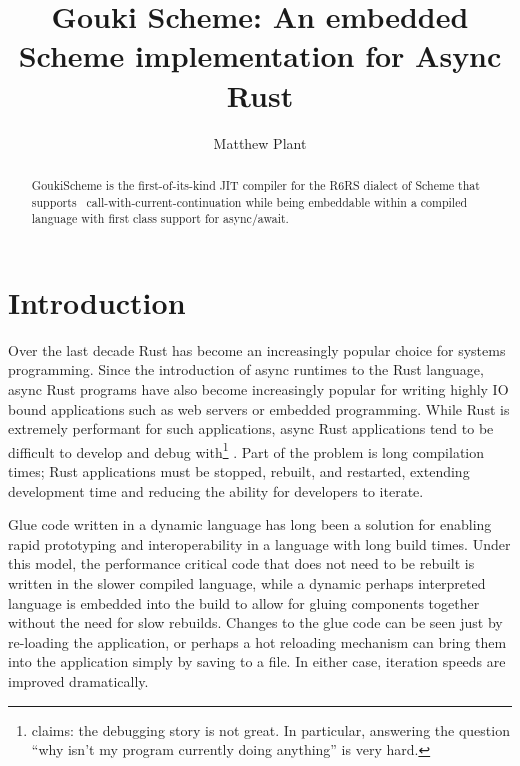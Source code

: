 \documentclass[sigplan,authordraft]{acmart}
\begin{document}
\title{Gouki Scheme: An embedded Scheme implementation for Async Rust}

\author{Matthew Plant}

\begin{abstract}

  GoukiScheme is the first-of-its-kind JIT compiler for the R6RS dialect of
  Scheme that supports \
  call-with-current-continuation while being embeddable
  within a compiled language with first class support for async/await.

\end{abstract}

\maketitle

\section{Introduction}

Over the last decade Rust has become an increasingly popular choice for systems
programming. Since the introduction of async runtimes to the Rust language,
async Rust programs have also become increasingly popular for writing highly
IO bound applications such as web servers or embedded programming. While Rust
is extremely performant for such applications\cite{embedded}, async Rust
applications tend to be difficult to develop and debug with\footnote{\citet{debugger} claims: the debugging story is not great. In particular, answering the question “why isn’t my program currently doing anything” is very hard.}
. Part of the problem
is long compilation times\cite{slow}; Rust applications must be stopped, rebuilt, and
restarted, extending development time and reducing the ability for developers to
iterate.

Glue code written in a dynamic language has long been a solution for enabling
rapid prototyping and interoperability in a language with long build times. Under
this model, the performance critical code that does not  need to be rebuilt is
written in the slower compiled language, while a dynamic perhaps interpreted
language is embedded into the build to allow for gluing components together
without the need for slow rebuilds. Changes to the glue code can be seen just by
re-loading the application, or perhaps a hot reloading mechanism can bring them
into the application simply by saving to a file. In either case, iteration
speeds are improved dramatically.
\end{document}
